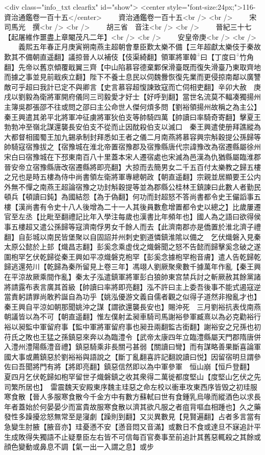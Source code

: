 <div class="info_txt clearfix" id="show">
<center style="font-size:24px;">116-資治通鑑卷一百十五</center>
  　　資治通鑑卷一百十五<br />
<br />
　　宋　司馬光　撰<br />
<br />
　　胡三省　音注<br />
<br />
　　晉紀三十七【起屠維作噩盡上章閹茂凡二年】<br />
<br />
　　安皇帝庚<br />
<br />
　　義熙五年春正月庚寅朔南燕主超朝會羣臣歎太樂不備【三年超獻太樂伎于秦故歎其不備朝直遥翻】議掠晉人以補伎【伎渠綺翻】領軍將軍韓曰【丁度曰竹角翻】先帝以舊京傾覆戢翼三齊【中山陷慕容德棄鄴保滑臺既而復失滑臺乃東取齊地而據之事並見前戢疾立翻】陛下不養士息民以伺魏釁恢復先業而更侵掠南鄰以廣讐敵可乎超曰我計已定不與卿言【史言慕容超愎諫致寇而亡伺相吏翻】辛卯大赦　庚戌以劉毅為衛將軍開府儀同三司毅愛才好士【好呼到翻】當世名流莫不輻凑獨揚州主簿吳郡張邵不往或問之邵曰主公命世人傑何煩多問【劉裕領揚州故稱之為主公】　秦王興遣其弟平北將軍冲征虜將軍狄伯支等帥騎四萬【帥讀曰率騎奇寄翻】擊夏王勃勃冲至嶺北謀還襲長安伯支不從而止因酖殺伯支以滅口　秦王興遣使册拜譙縱為大都督相國蜀王加九錫承制封拜悉如王者之儀二月南燕將慕容興宗斛穀提公孫歸等帥騎寇宿豫拔之【宿豫城在淮北帝置宿豫郡及宿豫縣唐代宗諱豫改為宿遷縣屬徐州宋白曰宿豫城在下邳東南百八十里蓋本宋人遷宿處也宋滅為邑漢為仇猶縣屬臨淮郡晉安帝立宿豫縣唐改宿遷縣將即亮翻】大掠而去簡男女二千五百付太樂教之歸五樓之兄也是時五樓為侍中尚書領左衛將軍專總朝政【朝直遥翻】宗親並居顯要王公内外無不憚之南燕王超論宿豫之功封斛穀提等並為郡縣公桂林王鎮諫曰此數人者勤民頓兵【頓讀曰鈍】為國結怨【為于偽翻】何功而封超怒不答尚書都令史王儼謟事五樓【漢尚書有令史十八人後增為二十一人其後員數愈增置都令史以總之】比歲屢遷官至左丞【比毗至翻禮記比年入學注每歲也漢書比年頻年也】國人為之語曰欲得侯事五樓超又遣公孫歸等寇濟南俘男女千餘人而去【此濟南郡亦是僑置於淮北濟子禮翻】自彭城以南民皆堡聚以自固詔并州刺史劉道憐鎮淮隂以備之　乞伏熾磐入見秦太原公懿於上邽【熾昌志翻】彭奚念乘虚伐之熾磐聞之怒不告懿而歸擊奚念破之遂圍枹罕乞伏乾歸從秦王興如平凉熾磐克枹罕【彭奚念據枹罕枹音膚】遣人告乾歸乾歸逃還苑川【乾歸為秦所留見上卷三年】馮翊人劉厥聚衆數千據萬年作亂【秦王興在平涼故厥乘間作亂】秦太子泓遣鎮軍將軍彭白狼帥東宫禁兵討之斬厥赦其餘黨諸將請露布表言廣其首級【帥讀曰率將即亮翻】泓不許曰主上委吾後事不能式遏寇逆當責躬請罪尚敢矜誕自為功乎【姚泓優游文義自儒者觀之似得子道然非撥亂才也】秦王興自平涼如朝那聞姚沖之謀【謂欲還襲長安也】賜沖死　三月劉裕抗表伐南燕朝議皆以為不可【朝直遥翻】惟左僕射孟昶車騎司馬謝裕參軍臧熹以為必克勸裕行裕以昶監中軍留府事【監中軍將軍留府事也昶丑兩翻監古銜翻】謝裕安之兄孫也初苻氏之敗也王猛之孫鎮惡來奔以為臨澧令【武帝太康四年立臨澧縣屬天門郡隋唐併入澧州澧陽縣澧音禮】鎮惡騎乘非長關弓甚弱【關讀曰彎】而有謀略善果斷喜論軍國大事或薦鎮惡於劉裕裕與語說之【斷丁亂翻喜許記翻說讀曰悦】因留宿明旦謂參佐曰吾聞將門有將【將即亮翻】鎮惡信然即以為中軍參軍　恒山崩【恒戶登翻】　夏四月乞伏乾歸如枹罕留世子熾磐鎮之收其衆得二萬徙都度堅山【度堅山乞伏之先司繁所居也】　雷震魏天安殿東序魏主珪惡之命左校以衝車攻東西序皆毁之初珪服寒食散【晉人多服寒食散今千金方中有數方蘇軾曰世有食鍾乳烏喙而縱酒色以求長年者蓋始於何晏晏少而富貴故服寒食散以濟其欲凡服之者疽背嘔血相踵也】久之藥發性多躁擾忿怒無常至是寖劇【躁則到翻】又災異數見【見賢遍翻】占者多言當有急變生肘腋【腋音亦】珪憂懣不安【懣音悶又音滿】或數日不食或達旦不寐追計平生成敗得失獨語不止疑羣臣左右皆不可信每百官奏事至前追計其舊惡輒殺之其餘或顔色變動或鼻息不調【氣一出一入謂之息】或步